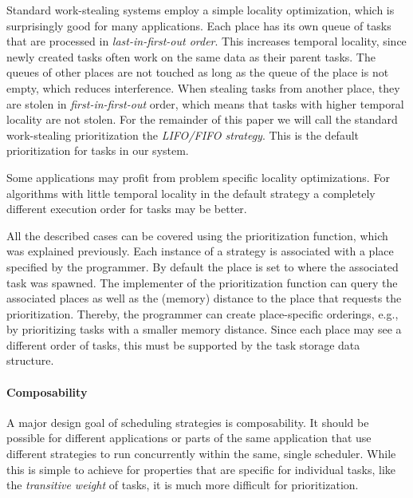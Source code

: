 \documentclass[a4paper,11pt]{article}
\begin{document}
Standard work-stealing systems employ a simple locality optimization,
which is surprisingly good for many applications. Each place has its
own queue of tasks that are processed in \emph{last-in-first-out
order}. This increases temporal locality, since newly created tasks
often work on the same data as their parent tasks. The queues of other
places are not touched as long as the queue of the place is not empty,
which reduces interference. When stealing tasks from another place,
they are stolen in \emph{first-in-first-out} order, which means that
tasks with higher temporal locality are not stolen.
For the remainder of this paper we will call the
standard work-stealing prioritization the \emph{LIFO/FIFO strategy}. This
is the default prioritization for tasks in our system.

Some applications may profit from problem specific locality
optimizations. For algorithms with little temporal locality in the default
strategy a completely different execution order for tasks may be better.

All the described cases can be covered using the prioritization
function, which was explained previously.  Each instance of a strategy is
associated with a place specified by the programmer. By default the
place is set to where the associated task was spawned. The implementer
of the prioritization function can query the associated places as well
as the (memory) distance to the place that requests the
prioritization. Thereby, the programmer can create place-specific
orderings, e.g., by prioritizing tasks with a smaller memory
distance. Since each place may see a different order of tasks, this
must be supported by the task storage data structure.

\paragraph{Composability}

A major design goal of scheduling strategies is composability. It
should be possible for different applications or parts of the same
application that use different strategies to run concurrently within
the same, single scheduler. While this is simple to achieve for
properties that are specific for individual tasks, like the
\emph{transitive weight} of tasks, it is much more difficult for
prioritization.
\end{document}
